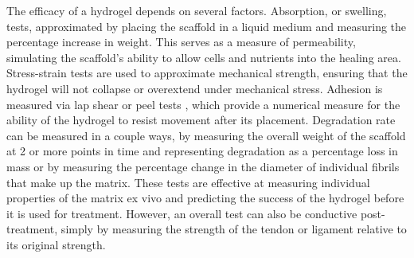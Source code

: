 The efficacy of a hydrogel depends on several factors. Absorption, or swelling, tests,
approximated by placing the scaffold in a liquid medium and measuring the percentage increase
in weight. This serves as a measure of permeability, simulating the scaffold's ability to allow cells
and nutrients into the healing area. Stress-strain tests are used to approximate mechanical
strength, ensuring that the hydrogel will not collapse or overextend under mechanical stress.
Adhesion is measured via lap shear or peel tests \autocite{RN5}, which provide a numerical
measure for the ability of the hydrogel to resist movement after its placement. Degradation rate
can be measured in a couple ways, by measuring the overall weight of the scaffold at 2 or more
points in time and representing degradation as a percentage loss in mass or by measuring the
percentage change in the diameter of individual fibrils that make up the matrix. These tests are
effective at measuring individual properties of the matrix ex vivo and predicting the success of
the hydrogel before it is used for treatment. However, an overall test can also be conductive
post-treatment, simply by measuring the strength of the tendon or ligament relative to its original
strength.